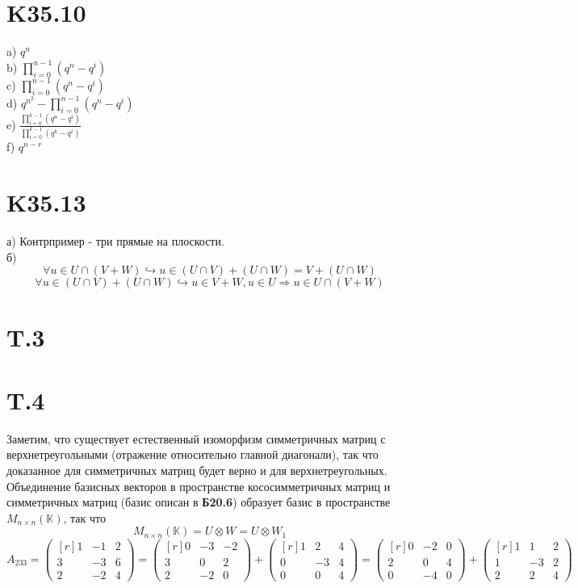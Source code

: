 \section*{K35.10}
a) $q^{n}$\\
b) $\prod_{i=0}^{n-1}\left(q^{n}-q^{i}\right)$\\
c) $\prod_{i=0}^{n-1}\left(q^{n}-q^{i}\right)$\\
d) $q^{n^2}-\prod_{i=0}^{n-1}\left(q^{n}-q^{i}\right)$\\
e) $\frac{\prod_{i=0}^{k-1}\left(q^{n}-q^{i}\right)}{\prod_{i=0}^{k-1}\left(q^{k}-q^{i}\right)}$\\
f) $q^{n-r}$
\section*{K35.13}
а) Контрпример - три прямые на плоскости.\\
б) $$\forall u\in U\cap(V+W)\hookrightarrow u\in (U\cap V)+(U\cap W)=V+(U\cap W)$$
$$\forall u\in (U\cap V)+(U\cap W)\hookrightarrow u\in V+W, u\in U\Rightarrow u\in U\cap(V+W)$$
\section*{T.3}

\section*{T.4}
Заметим, что существует естественный изоморфизм симметричных матриц с верхнетреугольными (отражение относительно главной диагонали), так что доказанное для симметричных матриц будет верно и для верхнетреугольных.\\
Объединение базисных векторов в пространстве кососимметричных матриц и симметричных матриц (базис описан в \textbf{Б20.6}) образует базис в пространстве $M_{n\times n}(\mathbb{K})$, так что $$M_{n\times n}(\mathbb{K})=U\otimes W=U\otimes W_1$$
$$A_{233}=\begin{pmatrix*}[r]
    1&-1&2\\
    3&-3&6\\
    2&-2&4
\end{pmatrix*}=\begin{pmatrix*}[r]
    0&-3&-2\\
    3&0&2\\
    2&-2&0
\end{pmatrix*}+\begin{pmatrix*}[r]
    1&2&4\\
    0&-3&4\\
    0&0&4
\end{pmatrix*}=\begin{pmatrix*}[r]
    0&-2&0\\
    2&0&4\\
    0&-4&0
\end{pmatrix*}+\begin{pmatrix*}[r]
    1&1&2\\
    1&-3&2\\
    2&2&4
\end{pmatrix*}$$
